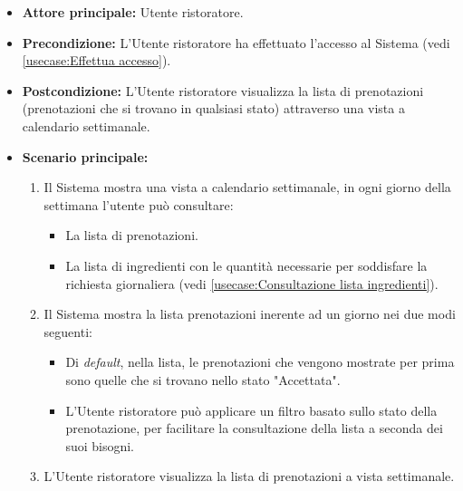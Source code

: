 \label{usecase:Visualizzazione lista prenotazioni}
\begin{itemize}
	\item \textbf{Attore principale:} Utente ristoratore.

	\item \textbf{Precondizione:} L'Utente ristoratore ha effettuato l'accesso al Sistema (vedi \autoref{usecase:Effettua accesso}).

	\item \textbf{Postcondizione:} L'Utente ristoratore visualizza la lista di prenotazioni (prenotazioni che si trovano in qualsiasi stato) attraverso una vista a calendario settimanale.

	\item \textbf{Scenario principale:}
	      \begin{enumerate}
		      \item Il Sistema mostra una vista a calendario settimanale, in ogni giorno della settimana l'utente può consultare:
		      \begin{itemize}
				\item La lista di prenotazioni.
				\item La lista di ingredienti con le quantità necessarie per soddisfare la richiesta giornaliera (vedi \autoref{usecase:Consultazione lista ingredienti}).
			  \end{itemize} 

		      \item Il Sistema mostra la lista prenotazioni inerente ad un giorno nei due modi seguenti:
		      \begin{itemize}
				\item Di \textit{default}, nella lista, le prenotazioni che vengono mostrate per prima sono quelle che si trovano nello stato "Accettata".
				\item L'Utente ristoratore può applicare un filtro basato sullo stato della prenotazione, per facilitare la consultazione della lista a seconda dei suoi bisogni.
			  \end{itemize}

		      \item L'Utente ristoratore visualizza la lista di prenotazioni a vista settimanale.
	      \end{enumerate}
\end{itemize}


